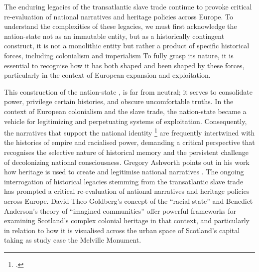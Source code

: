 \documentclass{scrartcl}
\renewcommand{\cite}{\parencite}
\begin{document}
 The enduring legacies of the transatlantic slave trade continue to provoke critical re-evaluation of national narratives and heritage policies across Europe. To understand the complexities of these legacies, we must first acknowledge the nation-state not as an immutable entity, but as a historically contingent construct, it is not a monolithic entity but rather a product of specific historical forces, including colonialism and imperialism 
To fully grasp its nature, it is essential to recognise how it has both shaped and been shaped by these forces, particularly in the context of European expansion and exploitation.

This construction of the nation-state , is far from neutral; it  serves to consolidate power, privilege certain histories, and obscure uncomfortable truths. In the context of European colonialism and the slave trade, the nation-state became a vehicle for legitimizing and perpetuating systems of exploitation. Consequently, the narratives that support the national identity \footcite[``the past was effectively rationalised at the end of 19th century (…)  if you want to create the concept of nation one of your principal instruments is the invention of a Heritage, which can justify, legitimate, demarcate this mythical idea of the nation which have to create them as opposed to us over there who are outside our heritage, so it was effectively rationalised''][]{gregory_ashworth_interview_2008}  are frequently intertwined with the histories of empire and racialised power, demanding a critical perspective that recognises the selective nature of historical memory and the persistent challenge of decolonizing national consciousness. Gregory Ashworth points out in his work how heritage is used to create and legitimise national narratives \cite[][]{gregory_ashworth_interview_2008}.
The ongoing interrogation of historical legacies stemming from the transatlantic slave trade has prompted a critical re-evaluation of national narratives and heritage policies across Europe. 
David Theo Goldberg's concept of the ``racial state'' and Benedict Anderson's theory of ``imagined communities'' offer powerful frameworks for examining Scotland's complex colonial heritage in that context, and particularly in relation to how it is visualised across the urban space of Scotland's capital taking as study case the Melville Monument.
\end{document}

